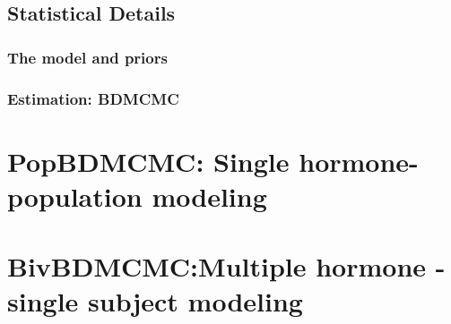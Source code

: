 \documentclass[11pt]{book}
\begin{document}
\section{Statistical Details}
\subsection{The model and priors}

\subsection{Estimation: BDMCMC}
\chapter{PopBDMCMC: Single hormone-population modeling}
\chapter{BivBDMCMC:Multiple hormone -single subject modeling}
\end{document}

